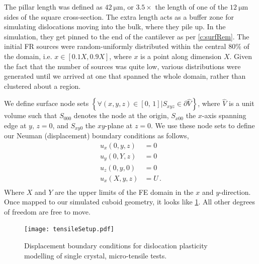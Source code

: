 The pillar length was defined as $\SI{42}{\micro\metre}$, or $3.5\times$ the length of one of the $\SI{12}{\micro\metre}$ sides of the square cross-section. The extra length acts as a buffer zone for simulating dislocations moving into the bulk, where they pile up. In the simulation, they get pinned to the end of the cantilever as per \cref{c:surfRem}. The initial FR sources were random-uniformly distributed within the central $80\%$ of the domain, i.e. $x \in [0.1X, 0.9X]$, where $x$ is a point along dimension $X$. Given the fact that the number of sources was quite low, various distributions were generated until we arrived at one that spanned the whole domain, rather than clustered about a region.

We define surface node sets $\left\{\forall (x, y, z) \in [0,\, 1] \vert S_{xyz} \in \partial \hat{V}\right\}$, where $\hat{V}$ is a unit volume such that $S_{000}$ denotes the node at the origin, $S_{x00}$ the $x$-axis spanning edge at $y,\, z=0$, and $S_{xy0}$ the $xy$-plane at $z=0$. We use these node sets to define our Neuman (displacement) boundary conditions as follows,
\begin{subequations}
    \begin{align}
        u_x(0, y, z) & = 0    \\
        u_y(0, Y, z) & = 0    \\
        u_z(0, y, 0) & = 0    \\
        u_x(X, y, z) & = U\,. \\
    \end{align}
\end{subequations}
Where $X$ and $Y$ are the upper limits of the FE domain in the $x$ and $y$-direction. Once mapped to our simulated cuboid geometry, it looks like \cref{f:tensileSetup}. All other degrees of freedom are free to move.
\begin{figure}
    \centering
    \texttt{[image: tensileSetup.pdf]}
    \caption[Displacement boundary conditions for dislocation plasticity modelling of single crystal, micro-tensile tests.]{Displacement boundary conditions for dislocation plasticity modelling of single crystal, micro-tensile tests.}
    \label{f:tensileSetup}
\end{figure}

